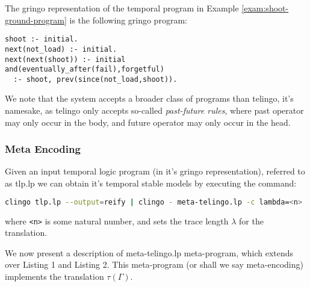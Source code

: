 \begin{example}\label{exam:shoot-ground-symbolic}
  The gringo representation of the temporal program in Example
  \ref{exam:shoot-ground-program} is the following gringo program:
\begin{center}
    \begin{lstlisting}[numbers=none]
shoot :- initial.
next(not_load) :- initial.
next(next(shoot)) :- initial
and(eventually_after(fail),forgetful) 
  :- shoot, prev(since(not_load,shoot)).
    \end{lstlisting}
\end{center}
\end{example}

We note that the system accepts a broader class of programs than
telingo, it's namesake, as telingo only accepts so-called
\emph{past-future rules}, where past operator may only occur in the
body, and future operator may only occur in the head.

\subsubsection{Meta Encoding}

Given an input temporal logic program (in it's gringo representation),
referred to as tlp.lp we can obtain it's temporal stable models by
executing the command:

\begin{lstlisting}[language=bash,numbers=none]
clingo tlp.lp --output=reify | clingo - meta-telingo.lp -c lambda=<n>
\end{lstlisting}

where \verb|<n>| is some natural number, and sets the trace length
$\lambda$ for the translation. 

We now present a description of meta-telingo.lp meta-program, which
extends over Listing 1 and Listing 2. This meta-program (or shall we
say meta-encoding) implements the translation $\tau(\Gamma)$.

